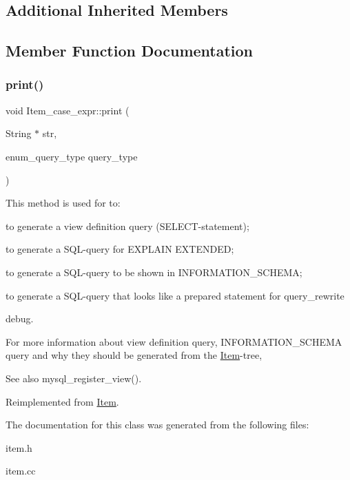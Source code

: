 \subsection*{Additional Inherited Members}


\subsection{Member Function Documentation}
\mbox{\label{classItem__case__expr_aaa00c7acd64b436ca4218d15ba8aa34e}} 
\subsubsection{\texorpdfstring{print()}{print()}}
{\footnotesize\ttfamily void Item\+\_\+case\+\_\+expr\+::print (\begin{DoxyParamCaption}\item[{String $\ast$}]{str,  }\item[{enum\+\_\+query\+\_\+type}]{query\+\_\+type }\end{DoxyParamCaption})\hspace{0.3cm}{\ttfamily [virtual]}}

This method is used for to\+:
\begin{DoxyItemize}
\item to generate a view definition query (S\+E\+L\+E\+CT-\/statement);
\item to generate a S\+QL-\/query for E\+X\+P\+L\+A\+IN E\+X\+T\+E\+N\+D\+ED;
\item to generate a S\+QL-\/query to be shown in I\+N\+F\+O\+R\+M\+A\+T\+I\+O\+N\+\_\+\+S\+C\+H\+E\+MA;
\item to generate a S\+QL-\/query that looks like a prepared statement for query\+\_\+rewrite
\item debug.
\end{DoxyItemize}

For more information about view definition query, I\+N\+F\+O\+R\+M\+A\+T\+I\+O\+N\+\_\+\+S\+C\+H\+E\+MA query and why they should be generated from the \mbox{\hyperlink{classItem}{Item}}-\/tree, \begin{DoxySeeAlso}{See also}
mysql\+\_\+register\+\_\+view(). 
\end{DoxySeeAlso}


Reimplemented from \mbox{\hyperlink{classItem_aa7ba4bde739d83adec8edf3bf1596d94}{Item}}.



The documentation for this class was generated from the following files\+:\begin{DoxyCompactItemize}
\item 
item.\+h\item 
item.\+cc\end{DoxyCompactItemize}
